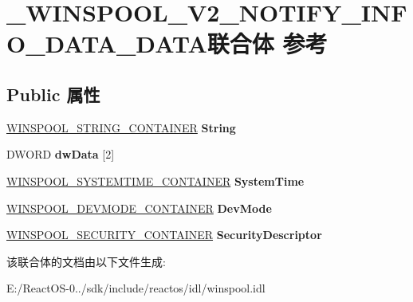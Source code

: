 \hypertarget{union___w_i_n_s_p_o_o_l___v2___n_o_t_i_f_y___i_n_f_o___d_a_t_a___d_a_t_a}{}\section{\+\_\+\+W\+I\+N\+S\+P\+O\+O\+L\+\_\+\+V2\+\_\+\+N\+O\+T\+I\+F\+Y\+\_\+\+I\+N\+F\+O\+\_\+\+D\+A\+T\+A\+\_\+\+D\+A\+T\+A联合体 参考}
\label{union___w_i_n_s_p_o_o_l___v2___n_o_t_i_f_y___i_n_f_o___d_a_t_a___d_a_t_a}
\subsection*{Public 属性}
\begin{DoxyCompactItemize}
\item 
\mbox{\label{union___w_i_n_s_p_o_o_l___v2___n_o_t_i_f_y___i_n_f_o___d_a_t_a___d_a_t_a_a4239849d831afd3aa9db5c6f025432ee}} 
\hyperlink{struct___w_i_n_s_p_o_o_l___s_t_r_i_n_g___c_o_n_t_a_i_n_e_r}{W\+I\+N\+S\+P\+O\+O\+L\+\_\+\+S\+T\+R\+I\+N\+G\+\_\+\+C\+O\+N\+T\+A\+I\+N\+ER} {\bfseries String}
\item 
\mbox{\label{union___w_i_n_s_p_o_o_l___v2___n_o_t_i_f_y___i_n_f_o___d_a_t_a___d_a_t_a_ab2cc971ca5ed3eda44f5ea8c42679656}} 
D\+W\+O\+RD {\bfseries dw\+Data} \mbox{[}2\mbox{]}
\item 
\mbox{\label{union___w_i_n_s_p_o_o_l___v2___n_o_t_i_f_y___i_n_f_o___d_a_t_a___d_a_t_a_a2a903a3096f2cefcbdb51ae609366b0a}} 
\hyperlink{struct___w_i_n_s_p_o_o_l___s_y_s_t_e_m_t_i_m_e___c_o_n_t_a_i_n_e_r}{W\+I\+N\+S\+P\+O\+O\+L\+\_\+\+S\+Y\+S\+T\+E\+M\+T\+I\+M\+E\+\_\+\+C\+O\+N\+T\+A\+I\+N\+ER} {\bfseries System\+Time}
\item 
\mbox{\label{union___w_i_n_s_p_o_o_l___v2___n_o_t_i_f_y___i_n_f_o___d_a_t_a___d_a_t_a_a3f9624ecc8bd566bd2d8d317c4b19eb9}} 
\hyperlink{struct___w_i_n_s_p_o_o_l___d_e_v_m_o_d_e___c_o_n_t_a_i_n_e_r}{W\+I\+N\+S\+P\+O\+O\+L\+\_\+\+D\+E\+V\+M\+O\+D\+E\+\_\+\+C\+O\+N\+T\+A\+I\+N\+ER} {\bfseries Dev\+Mode}
\item 
\mbox{\label{union___w_i_n_s_p_o_o_l___v2___n_o_t_i_f_y___i_n_f_o___d_a_t_a___d_a_t_a_a2072d40c958d2a3fb5e7225b32e890d7}} 
\hyperlink{struct___w_i_n_s_p_o_o_l___s_e_c_u_r_i_t_y___c_o_n_t_a_i_n_e_r}{W\+I\+N\+S\+P\+O\+O\+L\+\_\+\+S\+E\+C\+U\+R\+I\+T\+Y\+\_\+\+C\+O\+N\+T\+A\+I\+N\+ER} {\bfseries Security\+Descriptor}
\end{DoxyCompactItemize}


该联合体的文档由以下文件生成\+:\begin{DoxyCompactItemize}
\item 
E\+:/\+React\+O\+S-\/0../sdk/include/reactos/idl/winspool.\+idl\end{DoxyCompactItemize}
